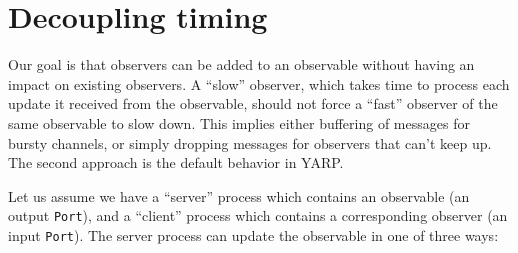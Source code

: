 
\section{Decoupling timing}

\label{sect:timing}

Our goal is that observers can be added to an observable without
having an impact on existing observers.  
%
A ``slow'' observer, which takes time to process each update it
received from the observable, should not force a ``fast'' observer of
the same observable to slow down.  This implies either buffering
of messages for bursty channels, or simply dropping messages for
observers that can't keep up.  The second approach is the default
behavior in YARP.

Let us assume we have a ``server'' process which contains an
observable (an output {\tt Port}), and a ``client'' process
which contains a corresponding observer (an input {\tt Port}).
The server process can update the observable in one of three ways:

